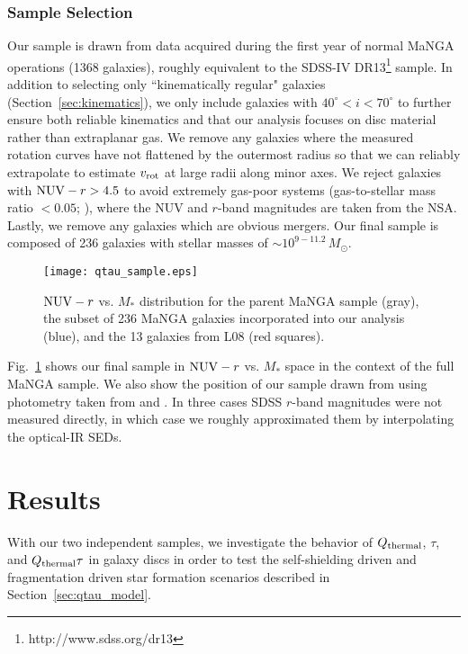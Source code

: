 \documentclass[fleqn,usenatbib]{mnras}
\newcommand{\msun}{M_{\odot}}
\newcommand{\qh}{Q_{\rm thermal}}
\begin{document}
\subsubsection{Sample Selection}
\label{sec:sample}
Our sample is drawn from data acquired during the first year of normal MaNGA operations (1368 galaxies), roughly equivalent to the SDSS-IV DR13\footnote{http://www.sdss.org/dr13} sample.  In addition to selecting only ``kinematically regular" galaxies (Section~\ref{sec:kinematics}), we only include galaxies with \mbox{$40^{\circ}<i<70^{\circ}$} to further ensure both reliable kinematics and that our analysis focuses on disc material rather than extraplanar gas. We remove any galaxies where the measured rotation curves have not flattened by the outermost radius so that we can reliably extrapolate to estimate $v_{\rm rot}$ at large radii along minor axes.  We reject galaxies with ${\rm NUV}-r>4.5$ to avoid extremely gas-poor systems (gas-to-stellar mass ratio $<0.05$; \citealt{Catinella13}), where the NUV and $r$-band magnitudes are taken from the NSA.  Lastly, we remove any galaxies which are obvious mergers. Our final sample is composed of 236 galaxies with stellar masses of ${\sim}10^{9-11.2}\,\msun$. 

\begin{figure}
\texttt{[image: qtau\_sample.eps]}
\caption{${\rm NUV}-r$ vs. $M_*$ distribution for the parent MaNGA sample (gray), the subset of 236 MaNGA galaxies incorporated into our analysis (blue), and the 13 galaxies from L08 (red squares).}
\label{fig:sample}
\end{figure}

Fig.~\ref{fig:sample} shows our final sample in ${\rm NUV}-r$ vs. $M_*$ space in the context of the full MaNGA sample. We also show the position of our sample drawn from \citet{Leroy08} using photometry taken from \citet{Munoz-Mateos09} and \cite{Brown14}.  In three cases SDSS $r$-band magnitudes were not measured directly, in which case we roughly approximated them by interpolating the optical-IR SEDs.

\section{Results} \label{sec:results}

With our two independent samples, we investigate the behavior of $\qh$, $\tau$, and $\qh\tau$ in galaxy discs in order to test the self-shielding driven and fragmentation driven star formation scenarios described in Section~\ref{sec:qtau_model}.
\end{document}
